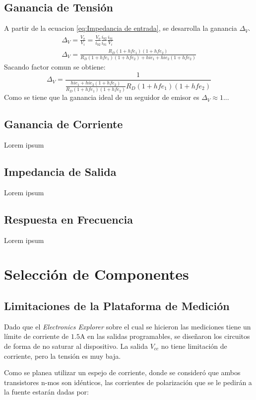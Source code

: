 \subsection{Ganancia de Tensión}
A partir de la ecuacion \ref{eq:Impedancia de entrada}, se desarrolla la ganancia $\Delta_V$.
\begin{align}
    \Delta_V = \frac{V_o}{V_i} = \frac{V_o}{i_{b2}} \frac{i_{b2}}{i_{b1}} \frac{i_{b1}}{V_i} \\
    \Delta_V = \frac{R_D(1+hfe_1)(1+hfe_2)}{R_D(1+hfe_1)(1+hfe_2) + hie_1 + hie_2(1+hfe_2)}
\end{align}
Sacando factor comun se obtiene:
\begin{equation}
    \Delta_V = \frac{1}{\frac{hie_1 + hie_2(1+hfe_2)}{R_D(1+hfe_1)(1+hfe_2)}{R_D(1+hfe_1)(1+hfe_2)}}
\end{equation}
Como se tiene que la ganancia ideal de un seguidor de emisor es $\Delta_V \approx 1$...


\subsection{Ganancia de Corriente}
Lorem ipsum
\subsection{Impedancia de Salida}
Lorem ipsum
\subsection{Respuesta en Frecuencia}
Lorem ipsum

\section{Selección de Componentes}
\subsection{Limitaciones de la Plataforma de Medición} \label{sec:EE_limits}

Dado que el \textit{Electronics Explorer} sobre el cual se hicieron las mediciones tiene un límite de corriente de $1.5 \si{\ampere}$ en las salidas programables, se diseñaron los circuitos de forma de no saturar al dispositivo. La salida $V_{cc}$ no tiene limitación de corriente, pero la tensión es muy baja.

Como se planea utilizar un espejo de corriente, donde se consideró que ambos transistores n-mos son idénticos, las corrientes de polarización que se le pedirán a la fuente estarán dadas por:

